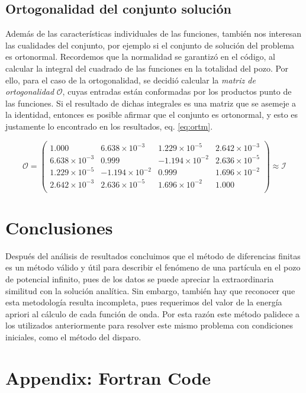 \documentclass[12pt,twoside]{extarticle}
\begin{document}
\subsection{Ortogonalidad del conjunto solución}
Además de las características individuales de las funciones, también nos interesan las cualidades del conjunto, por ejemplo si el conjunto de solución del problema es ortonormal. Recordemos que la normalidad se garantizó en el código, al calcular la integral del cuadrado de las funciones en la totalidad del pozo. Por ello, para el caso de la ortogonalidad, se decidió calcular la \textit{matriz de ortogonalidad} $\mathcal{O}$, cuyas entradas están conformadas por los productos punto de las funciones. Si el resultado de dichas integrales es una matriz que se asemeje a la identidad, entonces es posible afirmar que el conjunto es ortonormal, y esto es justamente lo encontrado en los resultados, eq. \ref{eq:ortm}.

\begin{equation}\label{eq:ortm}\mathcal{O} =\begin{pmatrix}
1.000               &  6.638\times 10^{-3} &  1.229\times 10^{-5} & 2.642\times 10^{-3}\\
6.638\times 10^{-3} &  0.999               & -1.194\times 10^{-2} & 2.636\times 10^{-5}\\
1.229\times 10^{-5} & -1.194\times 10^{-2} &  0.999               & 1.696\times 10^{-2}\\
2.642\times 10^{-3} &  2.636\times 10^{-5} &  1.696\times 10^{-2} & 1.000\\
\end{pmatrix}  \approx \mathcal{I} \end{equation} 


\section{Conclusiones}
\noindent Después del análisis de resultados concluimos que el método de diferencias finitas es un método válido y útil para describir el fenómeno de una partícula en el pozo de potencial infinito, pues de los datos se puede apreciar la extraordinaria similitud con la solución analítica. Sin embargo, también hay que reconocer que esta metodología resulta incompleta, pues requerimos del valor de la energía apriori al cálculo de cada función de onda. Por esta razón este método palidece a los utilizados anteriormente para resolver este mismo problema con condiciones iniciales, como el método del disparo.\cite{bobrow1983analisis}



\newpage\thispagestyle{empty}
\printbibliography{}

\newpage\thispagestyle{empty}
\appendix
\section{Appendix: Fortran Code}

\end{document}

